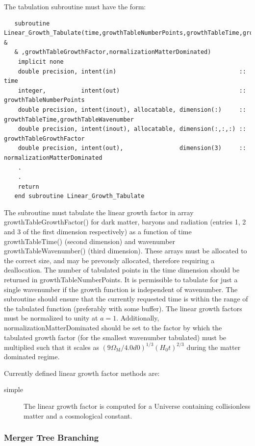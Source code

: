 The tabulation subroutine must have the form:
\begin{verbatim}
   subroutine Linear_Growth_Tabulate(time,growthTableNumberPoints,growthTableTime,growthTableWavenumber &
   & ,growthTableGrowthFactor,normalizationMatterDominated)
    implicit none
    double precision, intent(in)                                   :: time
    integer,          intent(out)                                  :: growthTableNumberPoints
    double precision, intent(inout), allocatable, dimension(:)     :: growthTableTime,growthTableWavenumber
    double precision, intent(inout), allocatable, dimension(:,:,:) :: growthTableGrowthFactor
    double precision, intent(out),                dimension(3)     :: normalizationMatterDominated
    .
    .
    return
   end subroutine Linear_Growth_Tabulate
\end{verbatim}
The subroutine must tabulate the linear growth factor in array {\normalfont \ttfamily growthTableGrowthFactor()} for dark matter, baryons and radiation (entries 1, 2 and 3 of the first dimension respectively) as a function of time {\normalfont \ttfamily growthTableTime()} (second dimension) and wavenumber {\normalfont \ttfamily growthTableWavenumber()} (third dimension). These arrays must be allocated to the correct size, and may be prevously allocated, therefore requiring a deallocation. The number of tabulated points in the time dimension should be returned in {\normalfont \ttfamily growthTableNumberPoints}. It is permissible to tabulate for just a single wavenumber if the growth function is independent of wavenumber. The subroutine should ensure that the currently requested {\normalfont \ttfamily time} is within the range of the tabulated function (preferably with some buffer). The linear growth factors must be normalized to unity at $a=1$. Additionally, {\normalfont \ttfamily normalizationMatterDominated} should be set to the factor by which the tabulated growth factor (for the smallest wavenumber tabulated) 
must be multiplied such that it scales as $(9 \Omega_\mathrm{M} / 4.0d0)^{1/3} (H_0 t)^{2/3}$ during the matter dominated regime.

Currently defined linear growth factor methods are:
\begin{description}
 \item [{\normalfont \ttfamily simple}] The linear growth factor is computed for a Universe containing collisionless matter and a cosmological constant.
\end{description}

\subsubsection{Merger Tree Branching}

